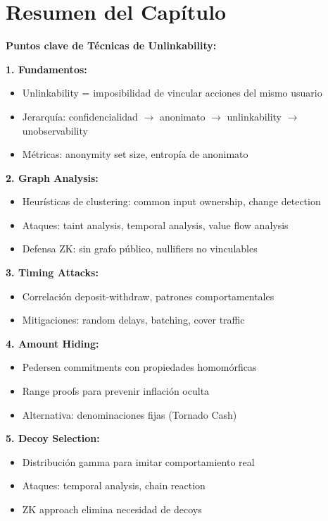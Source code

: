 \documentclass[11pt,a4paper,twoside]{book}
\begin{document}
\section{Resumen del Cap\'itulo}
\label{sec:resumen-cap8}

\begin{keyidea}
\textbf{Puntos clave de T\'ecnicas de Unlinkability:}

\textbf{1. Fundamentos:}
\begin{itemize}
    \item Unlinkability = imposibilidad de vincular acciones del mismo usuario
    \item Jerarqu\'ia: confidencialidad $\to$ anonimato $\to$ unlinkability $\to$ unobservability
    \item M\'etricas: anonymity set size, entrop\'ia de anonimato
\end{itemize}

\textbf{2. Graph Analysis:}
\begin{itemize}
    \item Heur\'isticas de clustering: common input ownership, change detection
    \item Ataques: taint analysis, temporal analysis, value flow analysis
    \item Defensa ZK: sin grafo p\'ublico, nullifiers no vinculables
\end{itemize}

\textbf{3. Timing Attacks:}
\begin{itemize}
    \item Correlaci\'on deposit-withdraw, patrones comportamentales
    \item Mitigaciones: random delays, batching, cover traffic
\end{itemize}

\textbf{4. Amount Hiding:}
\begin{itemize}
    \item Pedersen commitments con propiedades homom\'orficas
    \item Range proofs para prevenir inflaci\'on oculta
    \item Alternativa: denominaciones fijas (Tornado Cash)
\end{itemize}

\textbf{5. Decoy Selection:}
\begin{itemize}
    \item Distribuci\'on gamma para imitar comportamiento real
    \item Ataques: temporal analysis, chain reaction
    \item ZK approach elimina necesidad de decoys
\end{itemize}


\end{keyidea}
\end{document}
